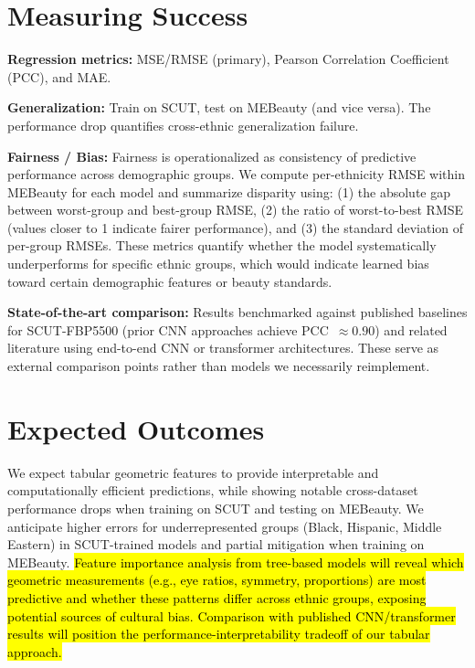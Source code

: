 \documentclass[a4paper,oneside,bibliography=totoc]{scrbook}
\begin{document}
\section{Measuring Success}

\noindent\textbf{Regression metrics:} MSE/RMSE (primary), Pearson Correlation Coefficient (PCC), and MAE.

\noindent\textbf{Generalization:} Train on SCUT, test on MEBeauty (and vice versa). The performance drop quantifies cross-ethnic generalization failure.

\noindent\textbf{Fairness / Bias:} Fairness is operationalized as consistency of predictive performance across demographic groups. We compute per-ethnicity RMSE within MEBeauty for each model and summarize disparity using: (1) the absolute gap between worst-group and best-group RMSE, (2) the ratio of worst-to-best RMSE (values closer to 1 indicate fairer performance), and (3) the standard deviation of per-group RMSEs. These metrics quantify whether the model systematically underperforms for specific ethnic groups, which would indicate learned bias toward certain demographic features or beauty standards.

\noindent\textbf{State-of-the-art comparison:} Results benchmarked against published baselines for SCUT-FBP5500 (prior CNN approaches achieve PCC~$\approx 0.90$) and related literature using end-to-end CNN or transformer architectures. These serve as external comparison points rather than models we necessarily reimplement.

\enlargethispage{\baselineskip}
\section{Expected Outcomes}

We expect tabular geometric features to provide interpretable and computationally efficient predictions, while showing notable cross-dataset performance drops when training on SCUT and testing on MEBeauty. We anticipate higher errors for underrepresented groups (Black, Hispanic, Middle Eastern) in SCUT-trained models and partial mitigation when training on MEBeauty. \hl{Feature importance analysis from tree-based models will reveal which geometric measurements (e.g., eye ratios, symmetry, proportions) are most predictive and whether these patterns differ across ethnic groups, exposing potential sources of cultural bias. Comparison with published CNN/transformer results will position the performance-interpretability tradeoff of our tabular approach.}


\end{document}
